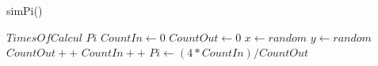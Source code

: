 \documentclass[11pt]{ctexart}
\begin{document}
\renewcommand{\thealgorithm}{1} %
    \begin{algorithm}
        \caption{simPi()} %
        \begin{algorithmic}[1] %
            \Require $TimesOfCalcul$
            \Ensure $Pi$
            \State $CountIn \leftarrow 0$
            \State $CountOut \leftarrow 0$
                \State $x \leftarrow random$
                \State $y \leftarrow random$
                \State $CountOut ++$
                    \State $CountIn++$
                \EndIf
                \State $Pi \leftarrow (4 \ast CountIn)/CountOut $
            \EndFor
        \end{algorithmic}
    \end{algorithm}
\end{document}
